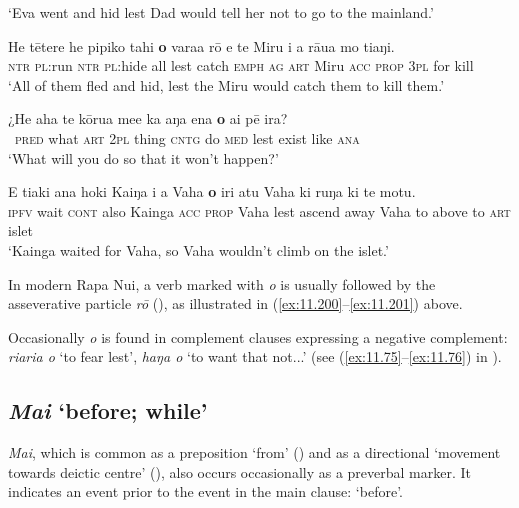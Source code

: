\glt 
‘Eva went and hid lest Dad would tell her not to go to the mainland.’ \textstyleExampleref{[R210.026]} 
\z

\ea\label{ex:11.201}
\gll He tētere he pipiko tahi \textbf{{\ꞌ}o} vara{\ꞌ}a rō e te Miru i a rāua mo tiaŋi. \\
\textsc{ntr} \textsc{pl}:run \textsc{ntr} \textsc{pl}:hide all lest catch \textsc{emph} \textsc{ag} \textsc{art} Miru \textsc{acc} \textsc{prop} \textsc{3pl} for kill \\

\glt 
‘All of them fled and hid, lest the Miru would catch them to kill them.’ \textstyleExampleref{[R304.039]} 
\z

\ea\label{ex:11.202}
\gll ¿He aha te kōrua me{\ꞌ}e ka aŋa ena \textbf{{\ꞌ}o} ai pē ira? \\
~\textsc{pred} what \textsc{art} \textsc{2pl} thing \textsc{cntg} do \textsc{med} lest exist like \textsc{ana} \\

\glt 
‘What will you do so that it won’t happen?’ \textstyleExampleref{[R648.239]} 
\z

\ea\label{ex:11.203}
\gll E tiaki {\ꞌ}ana hoki Kaiŋa i a Vaha \textbf{{\ꞌ}o} iri atu Vaha  ki ruŋa ki te motu.\\
\textsc{ipfv} wait \textsc{cont} also Kainga \textsc{acc} \textsc{prop} Vaha lest ascend away Vaha  to above to \textsc{art} islet\\

\glt
‘Kainga waited for Vaha, so Vaha wouldn’t climb on the islet.’ \textstyleExampleref{[Mtx-3-01.124]}
\z

In modern Rapa Nui, a verb marked with \textit{{\ꞌ}o} is usually followed by the asseverative particle \textit{rō} (), as illustrated in (\ref{ex:11.200}–\ref{ex:11.201}) above.

Occasionally \textit{{\ꞌ}o} is found in complement clauses expressing a negative complement: \textit{\mbox{ri{\ꞌ}ari{\ꞌ}a} {\ꞌ}o} ‘to fear lest’, \textit{haŋa {\ꞌ}o} ‘to want that not...’ (see (\ref{ex:11.75}–\ref{ex:11.76}) in ). 

\subsection{\textit{Mai} ‘before; while’}\label{sec:11.5.5}
\textit{Mai}, which is common as a preposition ‘from’ () and as a directional ‘movement towards deictic centre’ (), also occurs occasionally as a preverbal marker. It indicates an event prior to the event in the main clause: ‘before’.

